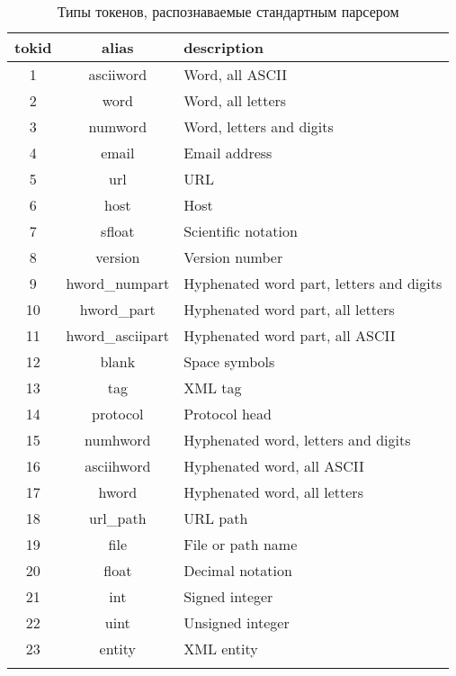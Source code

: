 \begin{longtable}{|c|c|l|}
    \hline
    \textbf{tokid} & \textbf{alias} & \textbf{description} \\ \hline
    1  & asciiword        & Word, all ASCII                       \\ \hline
    2  & word             & Word, all letters                     \\ \hline
    3  & numword          & Word, letters and digits              \\ \hline
    4  & email            & Email address                         \\ \hline
    5  & url              & URL                                   \\ \hline
    6  & host             & Host                                  \\ \hline
    7  & sfloat           & Scientific notation                   \\ \hline
    8  & version          & Version number                        \\ \hline
    9  & hword\_numpart   & Hyphenated word part, letters and digits \\ \hline
    10 & hword\_part      & Hyphenated word part, all letters      \\ \hline
    11 & hword\_asciipart & Hyphenated word part, all ASCII        \\ \hline
    12 & blank            & Space symbols                         \\ \hline
    13 & tag              & XML tag                               \\ \hline
    14 & protocol         & Protocol head                         \\ \hline
    15 & numhword         & Hyphenated word, letters and digits    \\ \hline
    16 & asciihword       & Hyphenated word, all ASCII             \\ \hline
    17 & hword            & Hyphenated word, all letters           \\ \hline
    18 & url\_path        & URL path                              \\ \hline
    19 & file             & File or path name                     \\ \hline
    20 & float            & Decimal notation                      \\ \hline
    21 & int              & Signed integer                        \\ \hline
    22 & uint             & Unsigned integer                      \\ \hline
    23 & entity           & XML entity                            \\ \hline
    \caption{Типы токенов, распознаваемые стандартным парсером}
    \label{standard-token-types}
\end{longtable}

